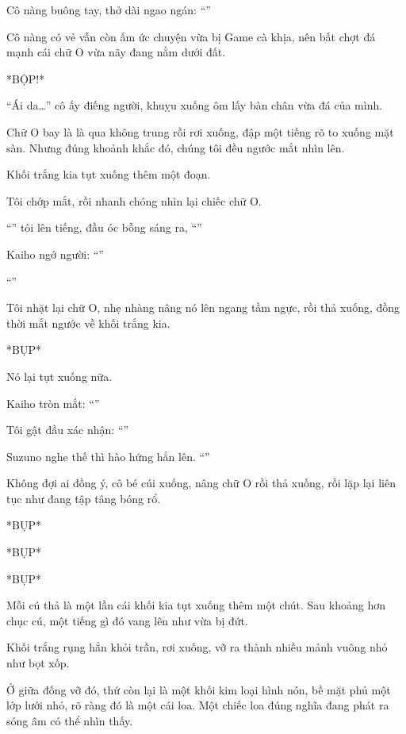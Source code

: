 \documentclass[../main.tex]{subfiles}
\begin{document}
Cô nàng buông tay, thở dài ngao ngán: ``''

Cô nàng có vẻ vẫn còn ấm ức chuyện vừa bị Game cà khịa, nên bất chợt đá mạnh cái chữ O vừa nãy đang nằm dưới đất.

*BỘP!*

``Ái da\dots'' cô ấy điếng người, khuỵu xuống ôm lấy bàn chân vừa đá của mình.

Chữ O bay là là qua không trung rồi rơi xuống, đập một tiếng rõ to xuống mặt sàn. Nhưng đúng khoảnh khắc đó, chúng tôi đều ngước mắt nhìn lên.

Khối trắng kia tụt xuống thêm một đoạn.

Tôi chớp mắt, rồi nhanh chóng nhìn lại chiếc chữ O.

``'' tôi lên tiếng, đầu óc bỗng sáng ra, ``''

Kaiho ngớ người: ``''

``''

Tôi nhặt lại chữ O, nhẹ nhàng nâng nó lên ngang tầm ngực, rồi thả xuống, đồng thời mắt ngước về khối trắng kia.

*BỤP*

Nó lại tụt xuống nữa.

Kaiho tròn mắt: ``''

Tôi gật đầu xác nhận: ``''

Suzuno nghe thế thì hào hứng hẳn lên. ``''

Không đợi ai đồng ý, cô bé cúi xuống, nâng chữ O rồi thả xuống, rồi lặp lại liên tục như đang tập tâng bóng rổ.

*BỤP*

*BỤP*

*BỤP*

Mỗi cú thả là một lần cái khối kia tụt xuống thêm một chút. Sau khoảng hơn chục cú, một tiếng gì đó vang lên như vừa bị đứt.

Khối trắng rụng hẳn khỏi trần, rơi xuống, vỡ ra thành nhiều mảnh vuông nhỏ như bọt xốp.

Ở giữa đống vỡ đó, thứ còn lại là một khối kim loại hình nón, bề mặt phủ một lớp lưới nhỏ, rõ ràng đó là một cái loa. Một chiếc loa đúng nghĩa đang phát ra sóng âm có thể nhìn thấy.
\end{document}

